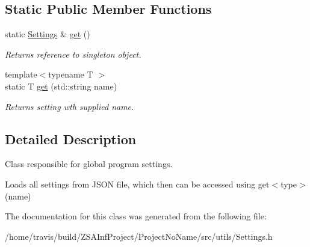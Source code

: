 \subsection*{Static Public Member Functions}
\begin{DoxyCompactItemize}
\item 
\hypertarget{classSettings_a96bb03527cdac607277841c4060669bd}{static \hyperlink{classSettings}{Settings} \& \hyperlink{classSettings_a96bb03527cdac607277841c4060669bd}{get} ()}\label{classSettings_a96bb03527cdac607277841c4060669bd}

\begin{DoxyCompactList}\small\item\em Returns reference to singleton object. \end{DoxyCompactList}\item 
\hypertarget{classSettings_ae1857fbbdf394bc8d6dc5e7a35e62c4f}{{\footnotesize template$<$typename T $>$ }\\static T \hyperlink{classSettings_ae1857fbbdf394bc8d6dc5e7a35e62c4f}{get} (std\-::string name)}\label{classSettings_ae1857fbbdf394bc8d6dc5e7a35e62c4f}

\begin{DoxyCompactList}\small\item\em Returns setting wth supplied name. \end{DoxyCompactList}\end{DoxyCompactItemize}


\subsection{Detailed Description}
Class responsible for global program settings. 

Loads all settings from J\-S\-O\-N file, which then can be accessed using get$<$type$>$(name) 

The documentation for this class was generated from the following file\-:\begin{DoxyCompactItemize}
\item 
/home/travis/build/\-Z\-S\-A\-Inf\-Project/\-Project\-No\-Name/src/utils/Settings.\-h\end{DoxyCompactItemize}

